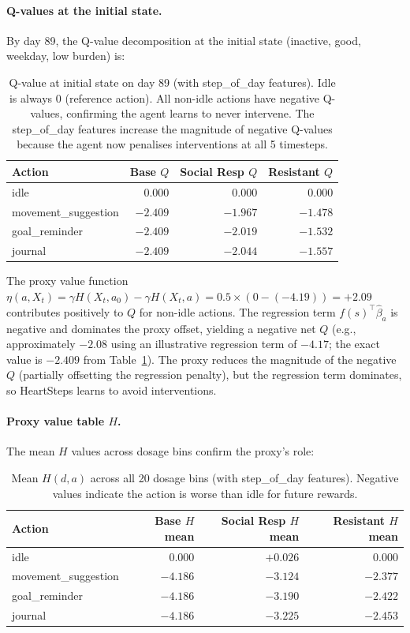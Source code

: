\documentclass[11pt]{article}
\begin{document}
\paragraph{Q-values at the initial state.}
By day 89, the Q-value decomposition at the initial state (inactive, good, weekday, low burden) is:

\begin{table}[h]
\centering
\begin{tabular}{lrrr}
\toprule
Action & Base $Q$ & Social Resp $Q$ & Resistant $Q$ \\
\midrule
idle & $0.000$ & $0.000$ & $0.000$ \\
movement\_suggestion & $-2.409$ & $-1.967$ & $-1.478$ \\
goal\_reminder & $-2.409$ & $-2.019$ & $-1.532$ \\
journal & $-2.409$ & $-2.044$ & $-1.557$ \\
\bottomrule
\end{tabular}
\caption{Q-value at initial state on day 89 (with step\_of\_day features). Idle is always 0 (reference action). All non-idle actions have negative Q-values, confirming the agent learns to never intervene. The step\_of\_day features increase the magnitude of negative Q-values because the agent now penalises interventions at all 5 timesteps.}
\label{tab:hs_qvalues}
\end{table}

The proxy value function $\eta(a, X_t) = \gamma H(X_t, a_0) - \gamma H(X_t, a) = 0.5 \times (0 - (-4.19)) = +2.09$ contributes positively to $Q$ for non-idle actions. The regression term $f(s)^\top \hat{\beta}_a$ is negative and dominates the proxy offset, yielding a negative net $Q$ (e.g., approximately $-2.08$ using an illustrative regression term of $-4.17$; the exact value is $-2.409$ from Table~\ref{tab:hs_qvalues}). The proxy reduces the magnitude of the negative $Q$ (partially offsetting the regression penalty), but the regression term dominates, so HeartSteps learns to avoid interventions.

\paragraph{Proxy value table $H$.}
The mean $H$ values across dosage bins confirm the proxy's role:

\begin{table}[h]
\centering
\begin{tabular}{lrrr}
\toprule
Action & Base $H$ mean & Social Resp $H$ mean & Resistant $H$ mean \\
\midrule
idle & $0.000$ & $+0.026$ & $0.000$ \\
movement\_suggestion & $-4.186$ & $-3.124$ & $-2.377$ \\
goal\_reminder & $-4.186$ & $-3.190$ & $-2.422$ \\
journal & $-4.186$ & $-3.225$ & $-2.453$ \\
\bottomrule
\end{tabular}
\caption{Mean $H(d, a)$ across all 20 dosage bins (with step\_of\_day features). Negative values indicate the action is worse than idle for future rewards.}
\label{tab:hs_proxy}
\end{table}
\end{document}
